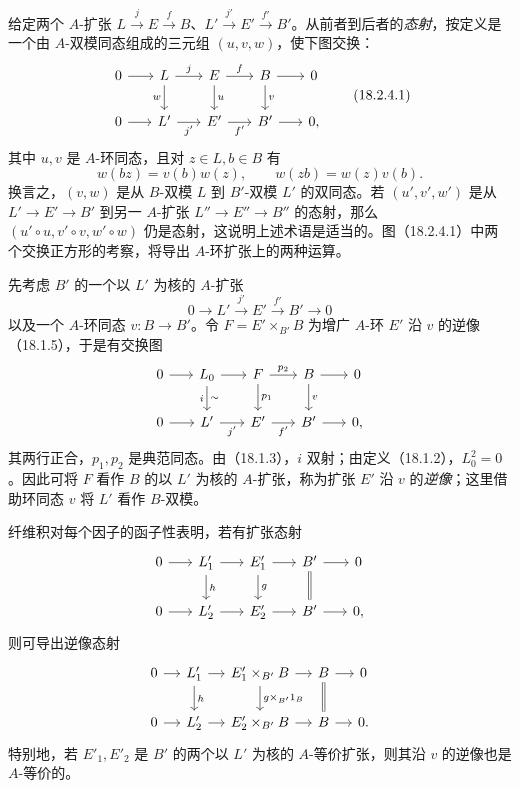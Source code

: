 给定两个 $A$-扩张 $L\xrightarrow{j}E\xrightarrow{f}B$、$L'\xrightarrow{j'}E'\xrightarrow{f'}B'$。从前者到后者的\emph{态射}，按定义是一个由 $A$-双模同态组成的三元组 $(u,v,w)$，使下图交换：
\begin{equation}
\begin{tikzcd}[column sep=1.7em]
0\arrow[r]&L\arrow[r,"j"]\arrow[d,"w"']&E\arrow[r,"f"]\arrow[d,"u"]&B\arrow[r]\arrow[d,"v"]&0\\
0\arrow[r]&L'\arrow[r,"j'"']&E'\arrow[r,"f'"']&B'\arrow[r]&0,
\end{tikzcd}
\tag{18.2.4.1}
\end{equation}
其中 $u,v$ 是 $A$-环同态，且对 $z\in L,b\in B$ 有
\[
 w(bz)=v(b)w(z),\qquad w(zb)=w(z)v(b).
\]
换言之，$(v,w)$ 是从 $B$-双模 $L$ 到 $B'$-双模 $L'$ 的双同态。若 $(u',v',w')$ 是从 $L'\to E'\to B'$ 到另一 $A$-扩张 $L''\to E''\to B''$ 的态射，那么 $(u'\circ u,v'\circ v,w'\circ w)$ 仍是态射，这说明上述术语是适当的。图（18.2.4.1）中两个交换正方形的考察，将导出 $A$-环扩张上的两种运算。

先考虑 $B'$ 的一个以 $L'$ 为核的 $A$-扩张
\[
 0\longrightarrow L'\xrightarrow{j'}E'\xrightarrow{f'}B'\longrightarrow0
\]
以及一个 $A$-环同态 $v:B\to B'$。令 $F=E'\times_{B'}B$ 为增广 $A$-环 $E'$ 沿 $v$ 的逆像（18.1.5），于是有交换图
\[
\begin{tikzcd}[column sep=1.7em]
0\arrow[r]&L_0\arrow[r]\arrow[d,"i"',"\sim"]&F\arrow[r,"p_2"]\arrow[d,"p_1"]&B\arrow[r]\arrow[d,"v"]&0\\
0\arrow[r]&L'\arrow[r,"j'"']&E'\arrow[r,"f'"']&B'\arrow[r]&0,
\end{tikzcd}
\]
其两行正合，$p_1,p_2$ 是典范同态。由（18.1.3），$i$ 双射；由定义（18.1.2），$L_0^2=0$。因此可将 $F$ 看作 $B$ 的以 $L'$ 为核的 $A$-扩张，称为扩张 $E'$ 沿 $v$ 的\emph{逆像}；这里借助环同态 $v$ 将 $L'$ 看作 $B$-双模。

纤维积对每个因子的函子性表明，若有扩张态射
\[
\begin{tikzcd}[column sep=1.7em]
0\arrow[r]&L'_1\arrow[r]\arrow[d,"h"]&E'_1\arrow[r]\arrow[d,"g"]&B'\arrow[r]\arrow[d,equal]&0\\
0\arrow[r]&L'_2\arrow[r]&E'_2\arrow[r]&B'\arrow[r]&0,
\end{tikzcd}
\]
则可导出逆像态射
\[
\begin{tikzcd}[column sep=1.2em]
0\arrow[r]&L'_1\arrow[r]\arrow[d,"h"]&E'_1\times_{B'}B\arrow[r]\arrow[d,"g\times_{B'}1_B"]&B\arrow[r]\arrow[d,equal]&0\\
0\arrow[r]&L'_2\arrow[r]&E'_2\times_{B'}B\arrow[r]&B\arrow[r]&0.
\end{tikzcd}
\]
特别地，若 $E'_1,E'_2$ 是 $B'$ 的两个以 $L'$ 为核的 $A$-等价扩张，则其沿 $v$ 的逆像也是 $A$-等价的。

